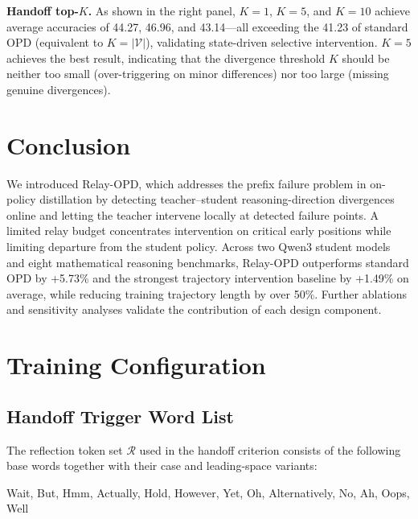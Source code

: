 \documentclass{article} %
\begin{document}
\textbf{Handoff top-$K$.} As shown in the right panel, $K=1$, $K=5$, and $K=10$ achieve average accuracies of 44.27, 46.96, and 43.14---all exceeding the 41.23 of standard OPD (equivalent to $K=|\mathcal V|$), validating state-driven selective intervention. $K=5$ achieves the best result, indicating that the divergence threshold $K$ should be neither too small (over-triggering on minor differences) nor too large (missing genuine divergences).\par

\section{Conclusion}\label{sec:conclusion}

We introduced Relay-OPD, which addresses the prefix failure problem in on-policy distillation by detecting teacher--student reasoning-direction divergences online and letting the teacher intervene locally at detected failure points. A limited relay budget concentrates intervention on critical early positions while limiting departure from the student policy. Across two Qwen3 student models and eight mathematical reasoning benchmarks, Relay-OPD outperforms standard OPD by +5.73\% and the strongest trajectory intervention baseline by +1.49\% on average, while reducing training trajectory length by over 50\%. Further ablations and sensitivity analyses validate the contribution of each design component.\par




\clearpage
\appendix

\section{Training Configuration}\label{app:training-config}

\subsection{Handoff Trigger Word List}\label{app:trigger-words}

The reflection token set $\mathcal R$ used in the handoff criterion consists of the following base words together with their case and leading-space variants:\par

\begin{promptbox}[title={Handoff Trigger Word List}, breakable=false]
\ttfamily
Wait, But, Hmm, Actually, Hold, However, Yet, Oh, Alternatively, No, Ah, Oops, Well
\end{promptbox}
\end{document}

